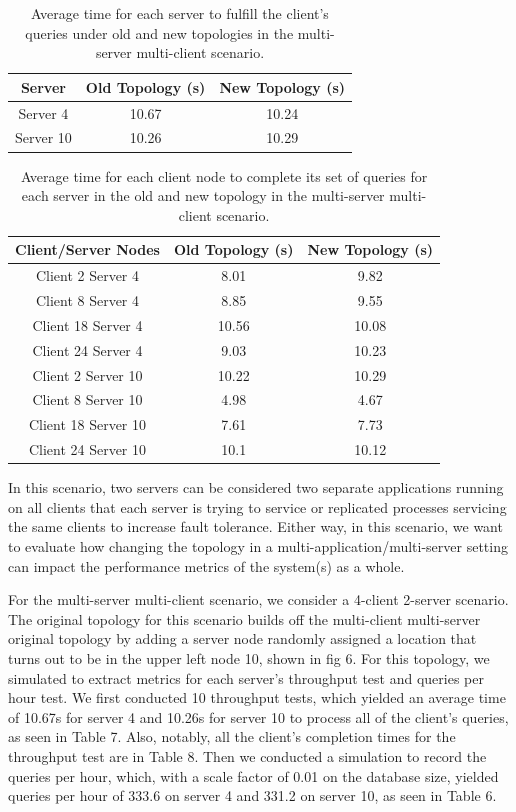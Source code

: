 \begin{table}[h!]
\centering
\begin{tabular}{|c|c|c|}
\hline
Server & Old Topology (s) & New Topology (s) \\ \hline
Server 4 & 10.67 & 10.24  \\ \hline
Server 10 & 10.26 & 10.29 \\ \hline
\end{tabular}
\caption{Average time for each server to fulfill the client's queries under old and new topologies in the multi-server multi-client scenario.}
\label{tab:my_label}
\end{table}


\begin{table}[h!]
\centering
\begin{tabular}{|c|c|c|}
\hline
Client/Server Nodes & Old Topology (s) & New Topology (s) \\ \hline
Client 2 Server 4 & 8.01  & 9.82  \\ \hline
Client 8 Server 4 & 8.85  & 9.55  \\ \hline
Client 18 Server 4 & 10.56 & 10.08 \\ \hline
Client 24 Server 4 & 9.03  & 10.23 \\ \hline
Client 2 Server 10 & 10.22 & 10.29 \\ \hline
Client 8 Server 10 & 4.98  & 4.67  \\ \hline
Client 18 Server 10 & 7.61  & 7.73  \\ \hline
Client 24 Server 10 & 10.1  & 10.12 \\ \hline
\end{tabular}
\caption{Average time for each client node to complete its set of queries for each server in the old and new topology in the multi-server multi-client scenario.}
\label{tab:my_label}
\end{table}

In this scenario, two servers can be considered two separate applications running on all clients that each server is trying to service or replicated processes servicing the same clients to increase fault tolerance. Either way, in this scenario, we want to evaluate how changing the topology in a multi-application/multi-server setting can impact the performance metrics of the system(s) as a whole.

For the multi-server multi-client scenario, we consider a 4-client 2-server scenario. The original topology for this scenario builds off the multi-client multi-server original topology by adding a server node randomly assigned a location that turns out to be in the upper left node 10, shown in fig 6. For this topology, we simulated to extract metrics for each server's throughput test and queries per hour test. We first conducted 10 throughput tests, which yielded an average time of 10.67s for server 4 and 10.26s for server 10 to process all of the client's queries, as seen in Table 7.  Also, notably, all the client's completion times for the throughput test are in Table 8. Then we conducted a simulation to record the queries per hour, which, with a scale factor of 0.01 on the database size, yielded queries per hour of 333.6 on server 4 and 331.2 on server 10, as seen in Table 6.

